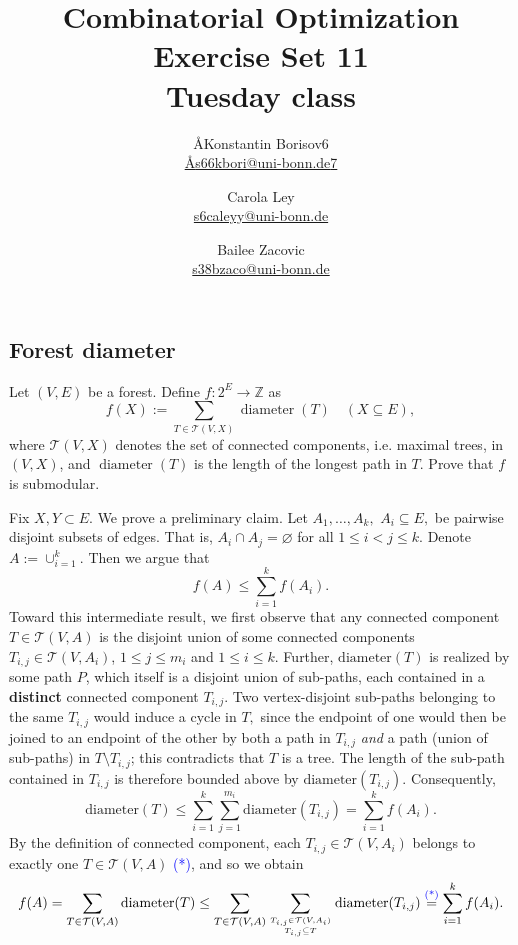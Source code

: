 \documentclass{article}
\title{Combinatorial Optimization \\ Exercise Set 11 \\ Tuesday class}
\author{
  \AA{Konstantin Borisov}{6} \\
  \href{mailto:\AA{s66kbori@uni-bonn.de}{7}}{\AA{s66kbori@uni-bonn.de}{7}}
  \and
  Carola Ley \\
  \href{mailto:s6caleyy@uni-bonn.de}{s6caleyy@uni-bonn.de}
  \and
  Bailee Zacovic \\
  \href{mailto:s38bzaco@uni-bonn.de}{s38bzaco@uni-bonn.de}
}
\let\emptyset\varnothing
\newcommand{\Z}{\mathbb{Z}}
\newcommand{\diameter}{\operatorname{diameter}}
\begin{document}
  \maketitle

  \setcounter{section}{11}
  \subsection{Forest diameter}
  \begin{centerframebox}
    Let $(V, E)$ be a forest. Define $f : 2^E \to \Z$ as
    \[ f(X) := \sum_{T \in \mathcal{T}(V,X) } \diameter(T) \quad (X\subseteq E), \]
    where $\mathcal{T}(V, X)$ denotes the set of connected components, i.e. maximal trees, in
    $(V, X)$, and $\diameter(T)$ is the length of the longest path in $T$. Prove that $f$ is
    submodular.
  \end{centerframebox}
  Fix $X,Y\subset E.$ We prove a preliminary claim. Let $A_1,\dots,A_k,$ $A_i\subseteq E,$ be pairwise disjoint subsets of edges. That is, $A_i\cap A_j=\emptyset$ for all $1\leq i<j\leq k.$ Denote $A:=\cup_{i=1}^k.$ Then we argue that\begin{equation}
       f\left(A\right)\leq \sum_{i=1}^k f(A_i).
  \end{equation}
  Toward this intermediate result, we first observe that any connected component $T\in \mathcal{T}(V,A)$ is the disjoint union of some connected components $T_{i,j}\in \mathcal{T}(V,A_i)$, $1\leq j\leq m_i$ and $1\leq i\leq k.$ Further, $\text{diameter}(T)$ is realized by some path $P$, which itself is a disjoint union of sub-paths, each contained in a \textbf{distinct} connected component $T_{i,j}$. Two vertex-disjoint sub-paths belonging to the same $T_{i,j}$ would induce a cycle in $T,$ since the endpoint of one would then be joined to an endpoint of the other by both a path in $T_{i,j}$ \textit{and} a path (union of sub-paths) in $T\setminus T_{i,j}$; this contradicts that $T$ is a tree. The length of the sub-path contained in $T_{i,j}$ is therefore bounded above by $\text{diameter}(T_{i,j}).$ Consequently,
  $$\text{diameter}(T)\leq \sum_{i=1}^k \sum_{j=1}^{m_i}\text{diameter}(T_{i,j})=\sum_{i=1}^k f(A_i).$$By the definition of connected component, each $T_{i,j}\in \mathcal{T}(V,A_i)$ belongs to exactly one $T\in \mathcal{T}(V,A)$ \textcolor{blue}{(*)}, and so we obtain
  $$f(A)=\sum_{T\in \mathcal{T}(V,A)} \text{diameter}(T)\leq \sum_{T\in \mathcal{T}(V,A)}\sum_{T_{i,j}\in \mathcal{T}(V,A_i)\atop T_{i,j}\subseteq T}\text{diameter}(T_{i,j})\overset{\text{\textcolor{blue}{(*)}}}{=}\sum_{i=1}^k f(A_i).$$
\end{document}
